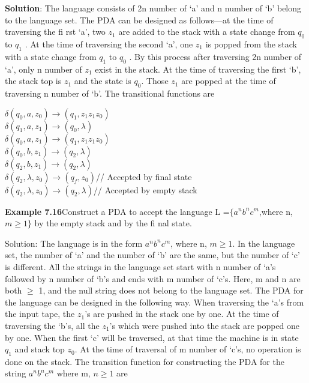 \documentclass{article}
\begin{document}
	\begin{flushleft}
		\textbf{Solution}: The language consists of 2n number of ‘a’ and n number of ‘b’ belong to the language set. The
		PDA can be designed as follows—at the time of traversing the fi rst ‘a’, two $z_1$ are added to the stack with
		a state change from $q_0$ to $q_1$ . At the time of traversing the second ‘a’, one $z_1$ is popped from the stack
		with a state change from $q_1$ to $q_0$ . By this process after traversing 2n number of ‘a’, only n number of $z_1$
		exist in the stack. At the time of traversing the first ‘b’, the stack top is $z_1$ and the state is $q_0$. Those $z_1$ are
		popped at the time of traversing n number of ‘b’.
		The transitional functions are
		
	\end{flushleft}
	\begin{center}
		\hspace{8mm}$\delta$$(q_0,a,z_0)\xrightarrow{}(q_1,z_1z_1z_0)$\\
		\hspace{1mm}$\delta$$(q_1,a,z_1)\xrightarrow{}(q_0,\lambda)$\\
		\hspace{8mm}$\delta$$(q_0,a,z_1)\xrightarrow{}(q_1,z_1z_1z_0)$\\
		$\delta$$(q_0,b,z_1)\xrightarrow{}(q_2,\lambda)$\\
		$\delta$$(q_2,b,z_1)\xrightarrow{}(q_2,\lambda)$\\
		\hspace{4.3cm}$\delta$$(q_2,\lambda,z_0)\xrightarrow{}(q_f,z_0)$// Accepted by final state\\
		\hspace{4.4cm}$\delta$$(q_2,\lambda,z_0)\xrightarrow{}(q_2,\lambda)$// Accepted by empty stack
	\end{center}
	\begin{flushleft}
	\textbf{Example 7.16}\hspace{5mm}Construct a PDA to accept the language L =$\lbrace$$a^{n}b^{n}c^{m}$,where n, $m \geq 1$$\rbrace$ by the empty stack and by the fi nal state.	
	\end{flushleft}
	\begin{flushleft}
		Solution: The language is in the form $a^{n}b^{n}c^{m}$, where n, $m \geq 1$. In the language set, the number of ‘a’ and
		the number of ‘b’ are the same, but the number of ‘c’ is different. All the strings in the language set start
		with n number of ‘a’s followed by n number of ‘b’s and ends with m number of ‘c’s. Here, m and n are
		both $\geq$ 1, and the null string does not belong to the language set.
		The PDA for the language can be designed in the following way.
		When traversing the ‘a’s from the input tape, the $z_1$’s are pushed in the stack one by one. At the time
		of traversing the ‘b’s, all the $z_1$’s which were pushed into the stack are popped one by one. When the
		first ‘c’ will be traversed, at that time the machine is in state $q_1$ and stack top $z_0$. At the time of traversal
		of m number of ‘c’s, no operation is done on the stack.
		The transition function for constructing the PDA for the string $a^{n}b^{n}c^{m}$ where m, $n \geq 1$ are
	\end{flushleft}
\end{document}
